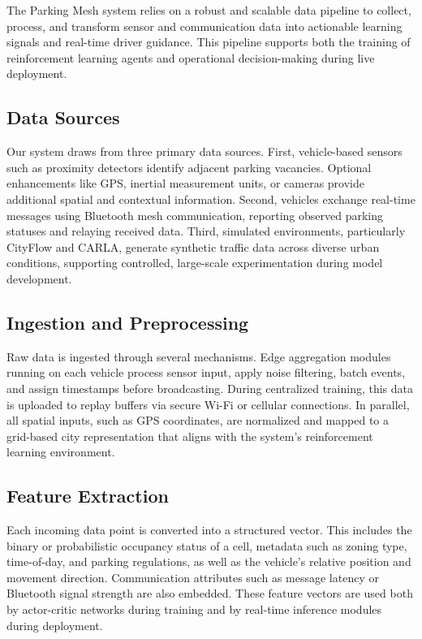

The Parking Mesh system relies on a robust and scalable data pipeline to collect, process, and transform sensor and communication data into actionable learning signals and real-time driver guidance. This pipeline supports both the training of reinforcement learning agents and operational decision-making during live deployment.

\subsection{Data Sources}
Our system draws from three primary data sources. First, vehicle-based sensors such as proximity detectors identify adjacent parking vacancies. Optional enhancements like GPS, inertial measurement units, or cameras provide additional spatial and contextual information. Second, vehicles exchange real-time messages using Bluetooth mesh communication, reporting observed parking statuses and relaying received data. Third, simulated environments, particularly CityFlow and CARLA, generate synthetic traffic data across diverse urban conditions, supporting controlled, large-scale experimentation during model development.

\subsection{Ingestion and Preprocessing}
Raw data is ingested through several mechanisms. Edge aggregation modules running on each vehicle process sensor input, apply noise filtering, batch events, and assign timestamps before broadcasting. During centralized training, this data is uploaded to replay buffers via secure Wi-Fi or cellular connections. In parallel, all spatial inputs, such as GPS coordinates, are normalized and mapped to a grid-based city representation that aligns with the system’s reinforcement learning environment.

\subsection{Feature Extraction}
Each incoming data point is converted into a structured vector. This includes the binary or probabilistic occupancy status of a cell, metadata such as zoning type, time-of-day, and parking regulations, as well as the vehicle’s relative position and movement direction. Communication attributes such as message latency or Bluetooth signal strength are also embedded. These feature vectors are used both by actor-critic networks during training and by real-time inference modules during deployment.

